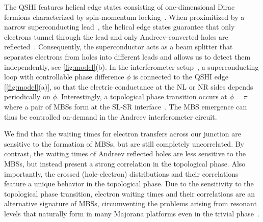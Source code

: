 \documentclass[aps,prl,amsmath,twocolumn,floatfix,superscriptaddress,longbibliography,footinbib]{revtex4-1}
\begin{document}
The QSHI features helical edge states consisting of one-dimensional Dirac fermions characterized by spin-momentum locking~\cite{Wu2006,Xu2006}. 
When proximitized by a narrow superconducting lead~\cite{Sullivan2012,Hart2014,Bocquillon2016,Bocquillon2017,Deacon2017,Hart2017,Sajadi2018,Fatemi2018}, the helical edge states guarantee that only electrons tunnel through the lead and only Andreev-converted holes are reflected~\cite{Adroguer2010,Black-Schaffer2012,Black-Schaffer2013,Crepin2015,Tkachov2015,Cayao2017,Keidel2018,Keidel2020,Cayao2022,Lu2022}. 
Consequently, the superconductor acts as a beam splitter that separates electrons from holes into different leads and allows us to detect them independently, see \cref{fig:model}(b). 
In the interferometer setup~\cite{Chandrasekhar1998,Chandrasekhar2001}, a superconducting loop with controllable phase difference $\phi$ is connected to the QSHI edge [\cref{fig:model}(a)], so that
the electric conductance at the NL or NR sides depends periodically on $\phi$. 
Interestingly, a topological phase transition occurs at $\phi=\pi$ where a pair of MBSs form at the SL-SR interface~\cite{Fu2008,Fu2009}. 
The MBS emergence can thus be controlled on-demand in the Andreev interferometer circuit. 

%
We find that the waiting times for electron transfers across 
our junction are sensitive to the formation of MBSs, but are still completely uncorrelated. 
%
By contrast, the waiting times of Andreev reflected holes are less sensitive to the MBSs, but instead present a strong correlation in the topological phase. 
%
Also importantly, the crossed (hole-electron) distributions and their correlations feature a unique behavior in the topological phase. 
%
Due to the sensitivity to the topological phase transition, electron waiting times and their correlations are an alternative signature of MBSs, circumventing the problems arising from resonant levels that naturally form in many Majorana platforms even in the trivial phase~\cite{Frolov2019}. 
\end{document}
